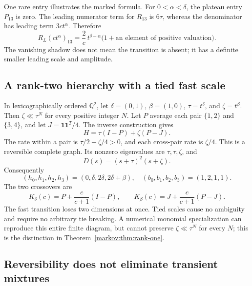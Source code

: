 \documentclass[11pt]{article}
\numberwithin{equation}{section}
\theoremstyle{definition}
\theoremstyle{remark}
\newcommand{\Q}{\mathbb Q}
\newcommand{\one}{\mathbf 1}
\begin{document}
One rare entry illustrates the marked formula. For $0<\alpha<\delta$, the
plateau entry $P_{13}$ is zero. The leading numerator term for $R_{13}$ is
$6\tau$, whereas the denominator has leading term $3ct^\alpha$. Therefore
\[
 R_L(ct^\alpha)_{13}
 =\frac{2}{c}\,t^{\delta-\alpha}
     \bigl(1+\text{an element of positive valuation}\bigr).
\]
The vanishing shadow does not mean the transition is absent; it has a definite
smaller leading scale and amplitude.

\subsection{A rank-two hierarchy with a tied fast scale}\label{markov:subsec:rank-two}

In lexicographically ordered $\Q^2$, let $\delta=(0,1)$, $\beta=(1,0)$,
$\tau=t^\delta$, and $\zeta=t^\beta$. Then $\zeta\ll\tau^N$ for every positive
integer $N$. Let $P$ average each pair $\{1,2\}$ and $\{3,4\}$, and let
$J=\one\one^T/4$. The inverse construction gives
\[
 H=\tau(I-P)+\zeta(P-J).
\]
The rate within a pair is $\tau/2-\zeta/4>0$, and each cross-pair rate is
$\zeta/4$. This is a reversible complete graph. Its nonzero eigenvalues are
$\tau,\tau,\zeta$, and
\[
 D(s)=(s+\tau)^2(s+\zeta).
\]
Consequently
\[
 (h_0,h_1,h_2,h_3)=(0,\delta,2\delta,2\delta+\beta),
 \quad(b_0,b_1,b_2,b_3)=(1,2,1,1).
\]
The two crossovers are
\[
 K_\delta(c)=P+\frac{c}{c+1}(I-P),\qquad
 K_\beta(c)=J+\frac{c}{c+1}(P-J).
\]
The fast transition loses two dimensions at once. Tied scales cause no
ambiguity and require no arbitrary tie breaking. A numerical monomial
specialization can reproduce this entire finite diagram, but cannot preserve
$\zeta\ll\tau^N$ for every $N$; this is the distinction in
Theorem~\ref{markov:thm:rank-one}.

\subsection{Reversibility does not eliminate transient mixtures}
\end{document}
